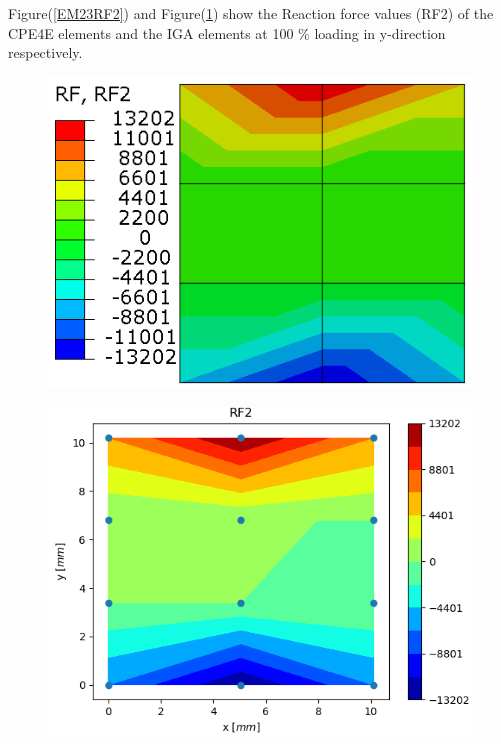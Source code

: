 \documentclass[11pt]{article}
\begin{document}
Figure(\ref{EM23RF2}) and Figure(\ref{EM23RF2_IGA}) show the Reaction force values (RF2) of the CPE4E elements and the IGA elements at 100 \% loading in y-direction respectively. \\
\begin{figure}[H]
	\centering
	\begin{minipage}{.5\textwidth}
		\centering
		\includegraphics[width=1\linewidth]{EM23RF2.png}
		\label{EM23RF2}
	\end{minipage}%
	\begin{minipage}{.5\textwidth}
		\centering
		\includegraphics[width=1\linewidth]{EM23RF2_IGA.png}
		\label{EM23RF2_IGA}
	\end{minipage}
\end{figure}
\end{document}
